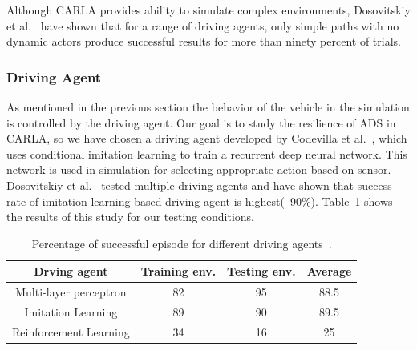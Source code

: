  \bigskip
 
 
 Although CARLA provides ability to simulate complex environments, Dosovitskiy et al.~\cite{Dosovitskiy17} have shown that for a range of driving agents, only simple paths with no dynamic actors produce successful results for more than ninety percent of trials.
 
 \medskip
 
 \subsubsection{Driving Agent}
 As mentioned in the previous section the behavior of the vehicle in the simulation is controlled by the driving agent. Our goal is to study the resilience of ADS in CARLA, so we have chosen a driving agent developed by Codevilla et al.~\cite{Codevilla2018}, which uses conditional imitation learning to train a recurrent deep neural network. This network is used in simulation for selecting appropriate action based on sensor. Dosovitskiy et al.~\cite{Dosovitskiy17} tested multiple driving agents and have shown that success rate of imitation learning based driving agent is highest(~90\%). Table~\ref{table:1} shows the results of this study for our testing conditions.
 
\begin{table}
	\begin{tabular}{| c | c | c | c |}
		\hline
		Drving agent & Training env. & Testing env. & Average  \\
		\hline
		Multi-layer perceptron & 82 & 95 & 88.5  \\ 
 		Imitation Learning & 89 & 90 & 89.5 \\  
 		Reinforcement Learning  & 34 & 16 & 25 \\
 		\hline
 	\end{tabular}
 \caption{Percentage of successful episode for different driving agents~\cite{Dosovitskiy17}.}
 \label{table:1}
\end{table}

